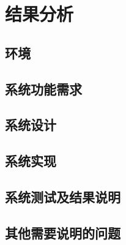 
\section{结果分析}
\subsection{环境}


\subsection{系统功能需求}


\subsection{系统设计}


\subsection{系统实现}


\subsection{系统测试及结果说明}


\subsection{其他需要说明的问题}